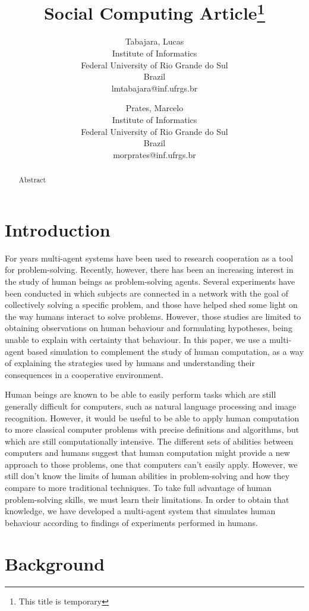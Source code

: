 \documentclass{article}
\title{Social Computing Article\thanks{This title is temporary}}
\author{Tabajara, Lucas \\
Institute of Informatics \\
Federal University of Rio Grande do Sul\\
Brazil \\
lmtabajara@inf.ufrgs.br
\and
Prates, Marcelo \\
Institute of Informatics \\
Federal University of Rio Grande do Sul\\
Brazil \\
morprates@inf.ufrgs.br}
\begin{document}
\maketitle

\begin{abstract}
  Abstract
\end{abstract}

\section{Introduction}

For years multi-agent systems have been used to research cooperation as a tool for problem-solving. Recently, however, there has been an increasing interest in the study of human beings as problem-solving agents. Several experiments have been conducted in which subjects are connected in a network with the goal of collectively solving a specific problem, and those have helped shed some light on the way humans interact to solve problems. However, those studies are limited to obtaining observations on human behaviour and formulating hypotheses, being unable to explain with certainty that behaviour. In this paper, we use a multi-agent based simulation to complement the study of human computation, as a way of explaining the strategies used by humans and understanding their consequences in a cooperative environment.

Human beings are known to be able to easily perform tasks which are still generally difficult for computers, such as natural language processing and image recognition. However, it would be useful to be able to apply human computation to more classical computer problems with precise definitions and algorithms, but which are still computationally intensive. The different sets of abilities between computers and humans suggest that human computation might provide a new approach to those problems, one that computers can't easily apply. However, we still don't know the limits of human abilities in problem-solving and how they compare to more traditional techniques. To take full advantage of human problem-solving skills, we must learn their limitations. In order to obtain that knowledge, we have developed a multi-agent system that simulates human behaviour according to findings of experiments performed in humans.

\section{Background}
\end{document}
